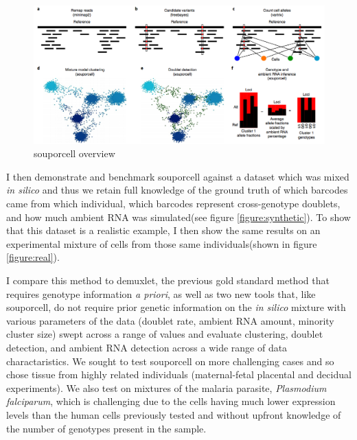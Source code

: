 \begin{figure}[th!]


\begin{centering}
\caption{souporcell overview}\label{fig:souporcell}

\includegraphics[width=\textwidth]{main.png} 
\end{centering}

\end{figure}
\par{
I then demonstrate and benchmark souporcell against a dataset which was mixed \textit{in silico} and thus we retain full knowledge of the ground truth of which barcodes came from which individual, which barcodes represent cross-genotype doublets, and how much ambient RNA was simulated(see figure \ref{figure:synthetic}). To show that this dataset is a realistic example, I then show the same results on an experimental mixture of cells from those same individuals(shown in figure \ref{figure:real}).
} 
\par{
I compare this method to demuxlet, the previous gold standard method that requires genotype information \textit{a priori}, as well as two new tools that, like souporcell, do not require prior genetic information\cite{vireo}\cite{scsplit} on the \textit{in silico} mixture with various parameters of the data (doublet rate, ambient RNA amount, minority cluster size) swept across a range of values and evaluate clustering, doublet detection, and ambient RNA detection across a wide range of data charactaristics. We sought to test souporcell on more challenging cases and so chose tissue from highly related individuals (maternal-fetal placental and decidual experiments). We also test on mixtures of the malaria parasite, \textit{Plasmodium falciparum}, which is challenging due to the cells having much lower expression levels than the human cells previously tested and without upfront knowledge of the number of genotypes present in the sample.
} 
